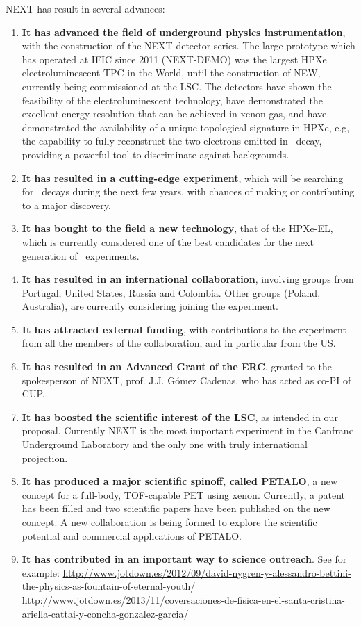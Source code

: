 NEXT has result in several advances:
\begin{enumerate}
\item {\bf It has advanced the field of underground physics instrumentation}, with the construction of the NEXT detector series. The large prototype which has operated at IFIC since 2011 (NEXT-DEMO) was the largest HPXe electroluminescent TPC in the World, until the construction of NEW, currently being commissioned at the LSC. The detectors have shown the feasibility of the electroluminescent technology, have demonstrated the excellent energy resolution that can be achieved in xenon gas, and have demonstrated  the availability of a unique topological signature in HPXe, e.g, the capability to fully reconstruct the two electrons emitted in \bb\ decay, providing a powerful tool to discriminate against backgrounds. 
\item {\bf It has resulted in a cutting-edge experiment}, which will be searching for \bbonu\ decays during the next few years, with chances of making or contributing to a major discovery. 
\item {\bf It has bought to the field a new technology}, that of the HPXe-EL, which is currently considered one of the best candidates for the next generation of \bbonu\ experiments.
 \item {\bf It has resulted in an international collaboration}, involving groups from Portugal, United States, Russia and Colombia. Other groups (Poland, Australia), are currently considering joining the experiment.
 \item {\bf It has attracted external funding}, with contributions to the experiment from all the members of the collaboration, and in particular from the US.
  \item {\bf It has resulted in an Advanced Grant of the ERC}, granted to the spokesperson of NEXT, prof. J.J. G\'omez Cadenas, who has acted as co-PI of CUP. 
   \item {\bf It has boosted the scientific interest of the LSC}, as intended in our proposal. Currently NEXT is the most important experiment in the Canfranc Underground Laboratory and the only one with truly international projection. 
  \item {\bf It has produced a major scientific spinoff, called PETALO}, a new concept for a full-body, TOF-capable PET using xenon. Currently, a patent has been filled and two scientific papers have been published on the new concept. A new collaboration is being formed to explore the scientific potential and commercial applications of PETALO. 
   \item {\bf It has contributed in an important way to science outreach}. See for example:
   \url{http://www.jotdown.es/2012/09/david-nygren-y-alessandro-bettini-the-physics-as-fountain-of-eternal-youth/}
   http://www.jotdown.es/2013/11/coversaciones-de-fisica-en-el-santa-cristina-ariella-cattai-y-concha-gonzalez-garcia/
\end{enumerate}
